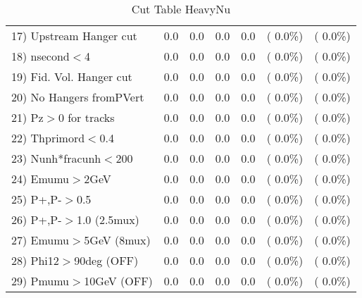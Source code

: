 \begin{table}[h!]
\begin{tabular}{||l||r|r|r|r|r|r||}
 17) Upstream Hanger cut  &          0.0 &          0.0 &          0.0 &          0.0 & (  0.0\%) & (  0.0\%) \\
 18) nsecond$<$4          &          0.0 &          0.0 &          0.0 &          0.0 & (  0.0\%) & (  0.0\%) \\
 19) Fid. Vol. Hanger cut &          0.0 &          0.0 &          0.0 &          0.0 & (  0.0\%) & (  0.0\%) \\
 20) No Hangers fromPVert &          0.0 &          0.0 &          0.0 &          0.0 & (  0.0\%) & (  0.0\%) \\
 21) Pz$>$0 for tracks    &          0.0 &          0.0 &          0.0 &          0.0 & (  0.0\%) & (  0.0\%) \\
 22) Thprimord$<$0.4      &          0.0 &          0.0 &          0.0 &          0.0 & (  0.0\%) & (  0.0\%) \\
 23) Nunh*fracunh$<$200   &          0.0 &          0.0 &          0.0 &          0.0 & (  0.0\%) & (  0.0\%) \\
 24) Emumu$>$2GeV         &          0.0 &          0.0 &          0.0 &          0.0 & (  0.0\%) & (  0.0\%) \\
 25) P+,P-$>$0.5          &          0.0 &          0.0 &          0.0 &          0.0 & (  0.0\%) & (  0.0\%) \\
 26) P+,P-$>$1.0 (2.5mux) &          0.0 &          0.0 &          0.0 &          0.0 & (  0.0\%) & (  0.0\%) \\
 27) Emumu$>$5GeV  (8mux) &          0.0 &          0.0 &          0.0 &          0.0 & (  0.0\%) & (  0.0\%) \\
 28) Phi12$>$90deg  (OFF) &          0.0 &          0.0 &          0.0 &          0.0 & (  0.0\%) & (  0.0\%) \\
 29) Pmumu$>$10GeV  (OFF) &          0.0 &          0.0 &          0.0 &          0.0 & (  0.0\%) & (  0.0\%) \\
 \hline
 \hline
 \end{tabular}
 \caption{Cut Table  HeavyNu  }
 \label{tab-cutheavy_neutrino}
 \end{table}
